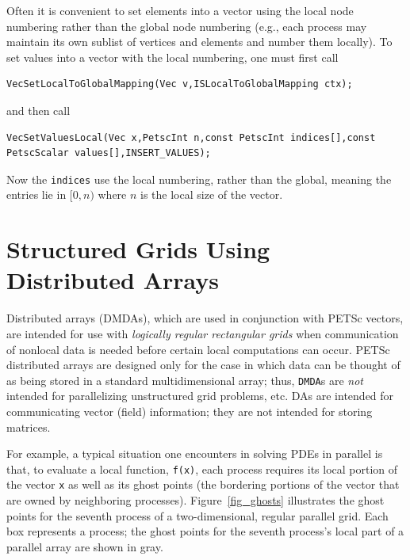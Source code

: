 Often it is convenient to set elements into a vector using the local node
numbering rather than the global node numbering (e.g.,  each process may
maintain its own sublist of vertices and elements and number them locally).
To set values into a vector with the local numbering, one must first call
\begin{lstlisting}
VecSetLocalToGlobalMapping(Vec v,ISLocalToGlobalMapping ctx);
\end{lstlisting}
and then call
\begin{lstlisting}
VecSetValuesLocal(Vec x,PetscInt n,const PetscInt indices[],const PetscScalar values[],INSERT_VALUES);
\end{lstlisting}
Now the \lstinline{indices} use the local numbering, rather than the global, meaning
the entries lie in $[0,n)$ where $n$ is the local size of the vector.

\section{Structured Grids Using Distributed Arrays}
\label{sec_da} \label{sec_struct}

Distributed arrays (DMDAs), which are used in
conjunction with PETSc vectors, are intended for use with {\em
logically regular rectangular grids} when communication of nonlocal data is
needed before certain local computations can occur.  PETSc distributed
arrays are designed only for the case in which data can be thought of
as being stored in a standard multidimensional array; thus, \lstinline{DMDA}s
are {\em not} intended for parallelizing unstructured grid problems, etc.
DAs are intended for communicating vector (field) information; they
are not intended for storing matrices.

For example, a typical situation one encounters in solving
PDEs in parallel is that, to evaluate a local function, \lstinline{f(x)}, each process
requires its local portion of the vector \lstinline{x} as well as its ghost
points  (the bordering portions of the vector
that are owned by neighboring processes).  Figure~\ref{fig_ghosts}
illustrates the ghost points for the seventh process of a
two-dimensional, regular parallel grid.  Each box represents a
process; the ghost points for the seventh process's local part of
a parallel array are shown in gray.

